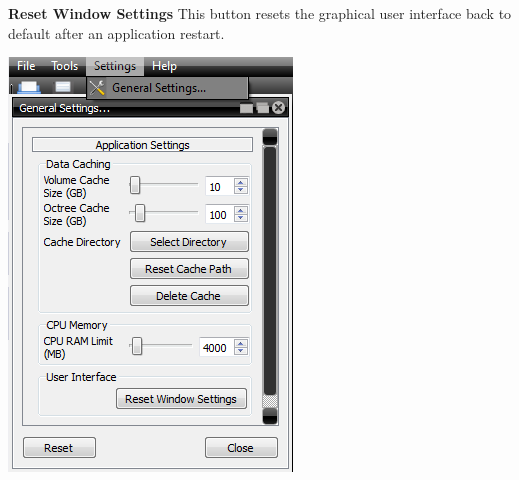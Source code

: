 \begin{minipage}[h]{\textwidth}
\begin{minipage}[h]{0.58\textwidth}
		\textbf{Reset Window Settings} This button resets the graphical user interface back to default after an application restart. 
	\end{minipage}
	\hfill
	\begin{minipage}[h]{0.38\textwidth}
		\includegraphics[width=\textwidth]{images/general_settings.png}
	\end{minipage}
	\par\endgroup
\end{minipage}
\newpage



